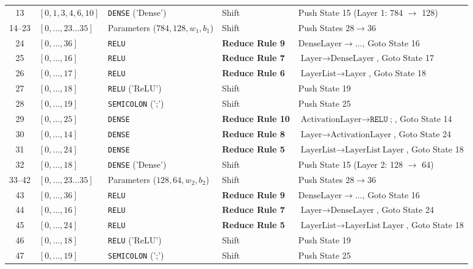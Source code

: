 \documentclass[11pt,a4paper]{article}
\begin{document}
\begin{table}[htbp]
\begin{tabular}{cllll}
13 & $[0, 1, 3, 4, 6, 10]$ & \texttt{DENSE} ('Dense') & Shift & Push State 15 (Layer 1: 784 $\to$ 128) \\
14--23 & $[0, \dots, 23 \dots 35]$ & Parameters ($784, 128, w_1, b_1$) & Shift & Push States $28 \to 36$ \\
24 & $[0, \dots, 36]$ & \texttt{RELU} & \textbf{Reduce Rule 9} & $\text{DenseLayer} \rightarrow \dots$, Goto State 16 \\
25 & $[0, \dots, 16]$ & \texttt{RELU} & \textbf{Reduce Rule 7} & $\text{Layer} \rightarrow \text{DenseLayer}$, Goto State 17 \\
26 & $[0, \dots, 17]$ & \texttt{RELU} & \textbf{Reduce Rule 6} & $\text{LayerList} \rightarrow \text{Layer}$, Goto State 18 \\
27 & $[0, \dots, 18]$ & \texttt{RELU} ('ReLU') & Shift & Push State 19 \\
28 & $[0, \dots, 19]$ & \texttt{SEMICOLON} (';') & Shift & Push State 25 \\
29 & $[0, \dots, 25]$ & \texttt{DENSE} & \textbf{Reduce Rule 10}& $\text{ActivationLayer} \rightarrow \texttt{RELU} \ \texttt{;}$, Goto State 14 \\
30 & $[0, \dots, 14]$ & \texttt{DENSE} & \textbf{Reduce Rule 8} & $\text{Layer} \rightarrow \text{ActivationLayer}$, Goto State 24 \\
31 & $[0, \dots, 24]$ & \texttt{DENSE} & \textbf{Reduce Rule 5} & $\text{LayerList} \rightarrow \text{LayerList} \ \text{Layer}$, Goto State 18 \\
32 & $[0, \dots, 18]$ & \texttt{DENSE} ('Dense') & Shift & Push State 15 (Layer 2: 128 $\to$ 64) \\
33--42 & $[0, \dots, 23 \dots 35]$ & Parameters ($128, 64, w_2, b_2$) & Shift & Push States $28 \to 36$ \\
43 & $[0, \dots, 36]$ & \texttt{RELU} & \textbf{Reduce Rule 9} & $\text{DenseLayer} \rightarrow \dots$, Goto State 16 \\
44 & $[0, \dots, 16]$ & \texttt{RELU} & \textbf{Reduce Rule 7} & $\text{Layer} \rightarrow \text{DenseLayer}$, Goto State 24 \\
45 & $[0, \dots, 24]$ & \texttt{RELU} & \textbf{Reduce Rule 5} & $\text{LayerList} \rightarrow \text{LayerList} \ \text{Layer}$, Goto State 18 \\
46 & $[0, \dots, 18]$ & \texttt{RELU} ('ReLU') & Shift & Push State 19 \\
47 & $[0, \dots, 19]$ & \texttt{SEMICOLON} (';') & Shift & Push State 25 \\

\end{tabular}
\end{table}
\end{document}

